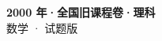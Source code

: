 \documentclass[zihao=-4, a4paper]{ctexart}
\begin{document}
\begin{center}
  {\Large\bfseries 2000 年·全国旧课程卷·理科}\\[4pt]
  {\large 数学 · 试题版}
\end{center}
\medskip
{}

\end{document}

